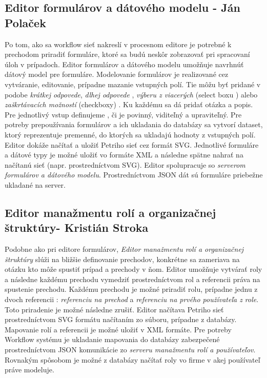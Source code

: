 \subsection{Editor formulárov a dátového modelu - Ján Polaček}
Po tom, ako sa workflow sieť nakreslí v procesnom editore je potrebné k prechodom priradiť formuláre, ktoré sa budú neskôr zobrazovať pri spracovaní úloh v prípadoch. Editor formulárov a dátového modelu umožňuje navrhnúť dátový model pre formuláre. Modelovanie formulárov je realizované cez vytváranie, editovanie, prípadne mazanie vstupných polí. Tie môžu byť pridané v podobe \emph{krátkej odpovede}, \emph{dlhej odpovede} , \emph{výberu z viacerých} (select boxu ) 	alebo \emph{zaškrtávacích možností } (checkboxy) . Ku každému sa dá pridať otázka a popis. Pre jednotlivý vstup definujeme , či je povinný, viditeľný a upraviteľný. Pre potreby prepoužívania formulárov a ich ukladania do databázy sa vytvorí dataset, ktorý reprezentuje premenné, do ktorých sa ukladajú hodnoty z vstupných polí. Editor dokáže načítať a uložiť Petriho sieť cez formát SVG. Jednotlivé formuláre a dátové typy je možné uložiť vo formáte XML a následne spätne nahrať na načítanú sieť (napr. prostredníctvom SVG). Editor spolupracuje so \emph{serverom formulárov a dátového modelu}. Prostredníctvom JSON dát sú formuláre priebežne ukladané na server.

\subsection{Editor manažmentu rolí a organizačnej štruktúry- Kristián Stroka}
Podobne ako pri editore formulárov, \emph{Editor manažmentu rolí a organizačnej štruktúry} slúži na bližšie definovanie prechodov, konkrétne sa zameriava na otázku kto môže spustiť prípad a prechody v ňom. Editor umožňuje vytvárať roly a následne každému prechodu vymedziť prostredníctvom  rol a referencii práva na spustenie prechodu. Každému prechodu je možné priradiť rolu, prípadne jednu z dvoch referencii : \emph{referenciu na prechod} a \emph{referenciu na prvého používateľa z role}. Toto priradenie je možné následne zrušiť. Editor načítava Petriho sieť prostredníctvom SVG formátu načítaním zo súboru, prípadne z databázy. Mapovanie rolí a referencii je možné uložiť v XML formáte. Pre potreby Workflow systému je ukladanie mapovania do databázy zabezpečené prostredníctvom JSON komunikácie  zo \emph{serveru manažmentu rolí a používateľov}. Rovnakým spôsobom je možné z databázy načítať roly vo firme v akej používateľ práve modeluje.

